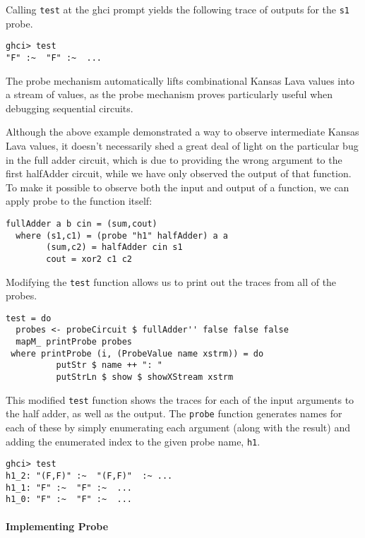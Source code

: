 \documentclass{llncs}
\begin{document}
Calling \verb!test! at the ghci prompt yields the following trace of outputs for
the \texttt{s1} probe. 

\begin{verbatim}
ghci> test
"F" :~  "F" :~  ...
\end{verbatim}

The probe mechanism automatically lifts combinational Kansas Lava
values into a stream of values, as the probe mechanism proves particularly
useful when debugging sequential circuits.

Although the above example demonstrated a way to observe intermediate Kansas
Lava values, it doesn't necessarily shed a great deal of light on the particular
bug in the full adder circuit, which is due to providing the wrong argument to
the first halfAdder circuit, while we have only observed the output of that
function. To make it possible to observe both the input and output of a
function, we can apply probe to the function itself:

\begin{verbatim}
fullAdder a b cin = (sum,cout)
  where (s1,c1) = (probe "h1" halfAdder) a a
        (sum,c2) = halfAdder cin s1
        cout = xor2 c1 c2
\end{verbatim}


Modifying the \verb!test! function allows us to print out the traces from all of
the probes.

\begin{verbatim}
test = do
  probes <- probeCircuit $ fullAdder'' false false false
  mapM_ printProbe probes
 where printProbe (i, (ProbeValue name xstrm)) = do
          putStr $ name ++ ": "
          putStrLn $ show $ showXStream xstrm
\end{verbatim}

This modified \verb!test! function shows the traces for each of the input
arguments to the half adder, as well as the output. The \verb!probe! function
generates names for each of these by simply enumerating each argument (along
with the result) and adding the enumerated index to the given probe name, \verb!h1!.

\begin{verbatim}
ghci> test
h1_2: "(F,F)" :~  "(F,F)"  :~ ...
h1_1: "F" :~  "F" :~  ...
h1_0: "F" :~  "F" :~  ...
\end{verbatim}

\paragraph{Implementing Probe}
\end{document}
